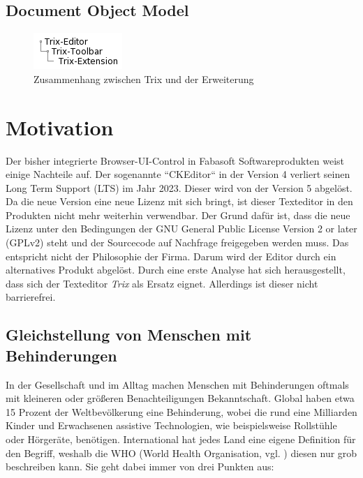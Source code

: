 \subsection{Document Object Model}
\begin{figure}[H]
\begin{center}
	\includegraphics[scale=1]{images/dom_tree.png}
\end{center}
	\caption{Zusammenhang zwischen Trix und der Erweiterung}
\end{figure}

\section{Motivation}
Der bisher integrierte Browser-UI-Control in Fabasoft Softwareprodukten weist einige Nachteile auf. Der sogenannte ``CKEditor`` \cite{ckeditor_v4_2020} in der Version 4 verliert seinen Long Term Support (LTS) im Jahr 2023. Dieser wird von der Version 5 \cite{ckeditor_v5_2020} abgelöst. Da die neue Version eine neue Lizenz mit sich bringt, ist dieser Texteditor in den Produkten nicht mehr weiterhin verwendbar. Der Grund dafür ist, dass die neue Lizenz unter den Bedingungen der GNU General Public License Version 2 or later (GPLv2) steht und der Sourcecode auf Nachfrage freigegeben werden muss. Das entspricht nicht der Philosophie der Firma. Darum wird der Editor durch ein alternatives Produkt abgelöst. Durch eine erste Analyse hat sich herausgestellt, dass sich der Texteditor {\em{Trix}} als Ersatz eignet. Allerdings ist dieser nicht barrierefrei.

\subsection{Gleichstellung von Menschen mit Behinderungen}
In der Gesellschaft und im Alltag machen Menschen mit Behinderungen oftmals mit kleineren oder größeren Benachteiligungen Bekanntschaft. Global haben etwa 15 Prozent der Weltbevölkerung eine Behinderung, wobei die rund eine Milliarden Kinder und Erwachsenen assistive Technologien, wie beispielsweise Rollstühle oder Hörgeräte, benötigen. International hat jedes Land eine eigene Definition für den Begriff, weshalb die WHO (World Health Organisation, vgl. \cite{who_disability_2011}) diesen nur grob beschreiben kann. Sie geht dabei immer von drei Punkten aus:

